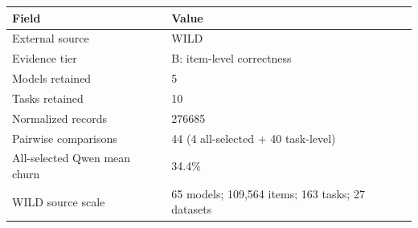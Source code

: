 \begin{tabular}{ll}
\toprule
Field & Value \\
\midrule
External source & WILD \\
Evidence tier & B: item-level correctness \\
Models retained & 5 \\
Tasks retained & 10 \\
Normalized records & 276685 \\
Pairwise comparisons & 44 (4 all-selected + 40 task-level) \\
All-selected Qwen mean churn & 34.4\% \\
WILD source scale & 65 models; 109,564 items; 163 tasks; 27 datasets \\
\bottomrule
\end{tabular}
